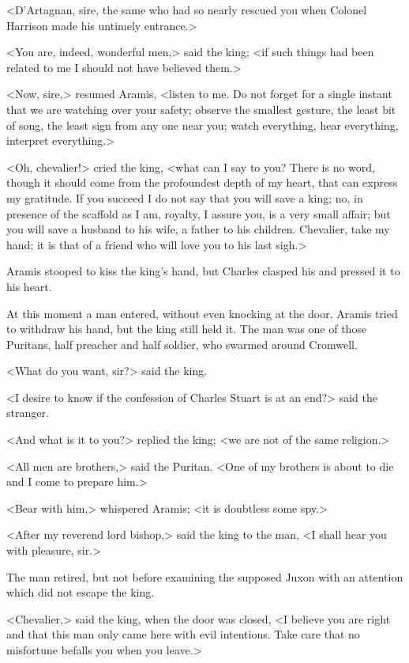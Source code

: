 <D'Artagnan, sire, the same who had so nearly rescued you when Colonel Harrison made his untimely entrance.>

<You are, indeed, wonderful men,> said the king; <if such things had been related to me I should not have believed them.>

<Now, sire,> resumed Aramis, <listen to me. Do not forget for a single instant that we are watching over your safety; observe the smallest gesture, the least bit of song, the least sign from any one near you; watch everything, hear everything, interpret everything.>

<Oh, chevalier!> cried the king, <what can I say to you? There is no word, though it should come from the profoundest depth of my heart, that can express my gratitude. If you succeed I do not say that you will save a king; no, in presence of the scaffold as I am, royalty, I assure you, is a very small affair; but you will save a husband to his wife, a father to his children. Chevalier, take my hand; it is that of a friend who will love you to his last sigh.>

Aramis stooped to kiss the king's hand, but Charles clasped his and pressed it to his heart.

At this moment a man entered, without even knocking at the door. Aramis tried to withdraw his hand, but the king still held it. The man was one of those Puritans, half preacher and half soldier, who swarmed around Cromwell.

<What do you want, sir?> said the king.

<I desire to know if the confession of Charles Stuart is at an end?> said the stranger.

<And what is it to you?> replied the king; <we are not of the same religion.>

<All men are brothers,> said the Puritan. <One of my brothers is about to die and I come to prepare him.>

<Bear with him,> whispered Aramis; <it is doubtless some spy.>

<After my reverend lord bishop,> said the king to the man, <I shall hear you with pleasure, sir.>

The man retired, but not before examining the supposed Juxon with an attention which did not escape the king.

<Chevalier,> said the king, when the door was closed, <I believe you are right and that this man only came here with evil intentions. Take care that no misfortune befalls you when you leave.>

